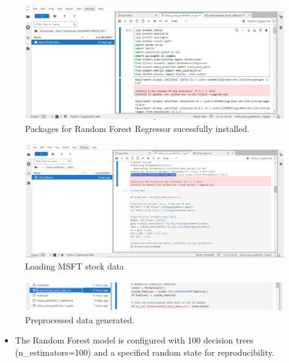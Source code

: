 \documentclass{article}
\begin{document}
\begin{figure}
    \centering
    \includegraphics[width=1\linewidth]{Capture12.PNG}
    \caption{Packages for Random Forest Regressor sucessfully installed.}
    \label{fig:enter-label}
\end{figure}
\begin{figure}
    \centering
    \includegraphics[width=1\linewidth]{Capture13.PNG}
    \caption{Loading MSFT stock data}
    \label{fig:enter-label}
\end{figure}
\begin{figure}
    \centering
    \includegraphics[width=1\linewidth]{Capture14.PNG}
    \caption{Preprocessed data generated.}
    \label{fig:enter-label}
\end{figure}
\begin{itemize}
  \item   The Random Forest model is configured with 100 decision trees (n\_estimators=100) and a specified random state for reproducibility.

\end{itemize}
\end{document}
